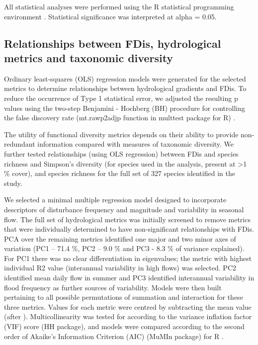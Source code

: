 \documentclass[openright,12pt,a4paper]{memoir}
\begin{document}
All statistical analyses were performed using the R statistical programming environment \cite{RCoreTeam2015}. Statistical significance was interpreted at alpha = 0.05.

\subsection{Relationships between FDis, hydrological metrics and taxonomic diversity}
Ordinary least-squares (OLS) regression models were generated for the selected metrics to determine relationships between hydrological gradients and FDis. To reduce the occurrence of Type 1 statistical error, we adjusted the resulting p values using the two-step Benjamini - Hochberg (BH) procedure \cite{Benjamini2006} for controlling the false discovery rate (mt.rawp2adjp function in multtest package for R) \cite{pollard2008multtest}.
 
The utility of functional diversity metrics depends on their ability to provide non-redundant information compared with measures of taxonomic diversity. We further tested relationships (using OLS regression) between FDis and species richness and Simpson’s diversity (for species used in the analysis, present at >1 \% cover), and species richness for the full set of 327 species identified in the study. 

We selected a minimal multiple regression model designed to incorporate descriptors of disturbance frequency and magnitude and variability in seasonal flow. The full set of hydrological metrics was initially screened to remove metrics that were individually determined to have non-significant relationships with FDis. PCA over the remaining metrics identified one major and two minor axes of variation (PC1 – 71.4 \%, PC2 – 9.0 \% and PC3 - 8.3 \% of variance explained). For PC1 there was no clear differentiation in eigenvalues; the metric with highest individual R2 value (interannual variability in high flows) was selected. PC2 identified mean daily flow in summer and PC3 identified interannual variability in flood frequency as further sources of variability. Models were then built pertaining to all possible permutations of summation and interaction for these three metrics. Values for each metric were centred by subtracting the mean value (after \cite{Robinson2009}). Multicollinearity was tested for according to the variance inflation factor (VIF) score (HH package), \cite{heiberger2004statistical} and models were compared according to the second order of Akaike’s Information Criterion (AIC) (MuMIn package) for R \cite{barton2012mumin, burnham2002model}.
\end{document}
